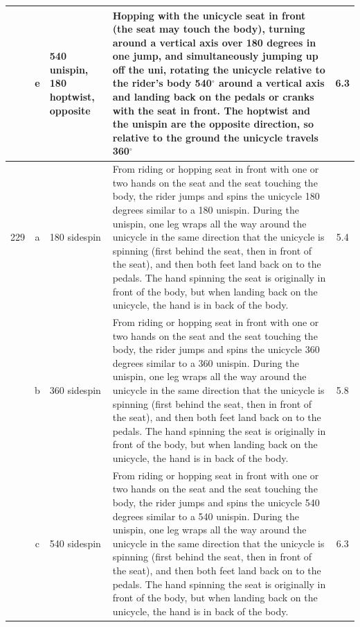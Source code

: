\begin{longtable}{|r|c|p{4cm}|p{8cm}|c|}
\hline
  & e & 540 unispin, 180 hoptwist, opposite & Hopping with the unicycle seat in front (the seat may touch the body), turning around a vertical axis over 180 degrees in one jump, and simultaneously jumping up off the uni, rotating the unicycle relative to the rider’s body 540$^\circ$ around a vertical axis and landing back on the pedals or cranks with the seat in front. The hoptwist and the unispin are the opposite direction, so relative to the ground the unicycle travels 360$^\circ$ & 6.3 \\ 
\hline
229 & a & 180 sidespin  & From riding or hopping seat in front with one or two hands on the seat and the seat touching the body, the rider jumps and spins the unicycle 180 degrees similar to a 180 unispin. During the unispin, one leg wraps all the way around the unicycle in the same direction that the unicycle is spinning (first behind the seat, then in front of the seat), and then both feet land back on to the pedals. The hand spinning the seat is originally in front of the body, but when landing back on the unicycle, the hand is in back of the body. & 5.4 \\ 
\hline
  & b & 360 sidespin  & From riding or hopping seat in front with one or two hands on the seat and the seat touching the body, the rider jumps and spins the unicycle 360 degrees similar to a 360 unispin. During the unispin, one leg wraps all the way around the unicycle in the same direction that the unicycle is spinning (first behind the seat, then in front of the seat), and then both feet land back on to the pedals. The hand spinning the seat is originally in front of the body, but when landing back on the unicycle, the hand is in back of the body. & 5.8 \\ 
\hline
  & c & 540 sidespin  & From riding or hopping seat in front with one or two hands on the seat and the seat touching the body, the rider jumps and spins the unicycle 540 degrees similar to a 540 unispin. During the unispin, one leg wraps all the way around the unicycle in the same direction that the unicycle is spinning (first behind the seat, then in front of the seat), and then both feet land back on to the pedals. The hand spinning the seat is originally in front of the body, but when landing back on the unicycle, the hand is in back of the body. & 6.3 \\ 
\hline
\end{longtable}
\newpage

